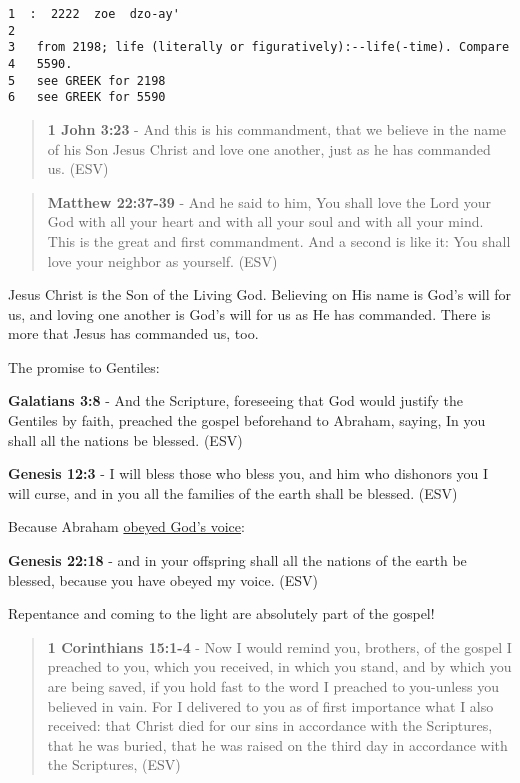 \documentclass[11pt]{article}
\begin{document}
\begin{verbatim}
1  :  2222  zoe  dzo-ay'
2  
3   from 2198; life (literally or figuratively):--life(-time). Compare
4   5590.
5   see GREEK for 2198
6   see GREEK for 5590
\end{verbatim}

\begin{quote}
\textbf{1 John 3:23} - And this is his commandment, that we believe in the name of his Son Jesus Christ and love one another, just as he has commanded us. (ESV)
\end{quote}

\begin{quote}
\textbf{Matthew 22:37-39} - And he said to him, You shall love the Lord your God with all your heart and with all your soul and with all your mind. This is the great and first commandment. And a second is like it: You shall love your neighbor as yourself. (ESV)
\end{quote}

Jesus Christ is the Son of the Living God. Believing on His name is God's will for us, and loving one another is God's will for us as He has commanded. There is more that Jesus has commanded us, too.

The promise to Gentiles:

\textbf{Galatians 3:8} - And the Scripture, foreseeing that God would justify the Gentiles by faith, preached the gospel beforehand to Abraham, saying, In you shall all the nations be blessed. (ESV)

\textbf{Genesis 12:3} - I will bless those who bless you, and him who dishonors you I will curse, and in you all the families of the earth shall be blessed. (ESV)

Because Abraham \uline{obeyed God's voice}:

\textbf{Genesis 22:18} - and in your offspring shall all the nations of the earth be blessed, because you have obeyed my voice. (ESV)

Repentance and coming to the light are absolutely part of the gospel!

\begin{quote}
\textbf{1 Corinthians 15:1-4} -  Now I would remind you, brothers, of the gospel I preached to you, which you received, in which you stand, and by which you are being saved, if you hold fast to the word I preached to you-unless you believed in vain.  For I delivered to you as of first importance what I also received: that Christ died for our sins in accordance with the Scriptures, that he was buried, that he was raised on the third day in accordance with the Scriptures,  (ESV)
\end{quote}
\end{document}
